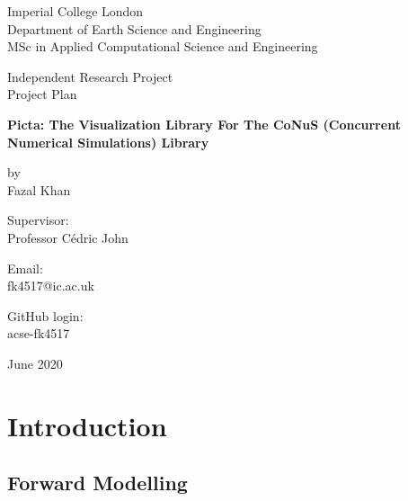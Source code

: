 \documentclass[12pt]{article}
\begin{document}
\begin{titlepage}
	\begin{center}
		\vspace*{1cm}
		
		Imperial College London \\
		Department of Earth Science and Engineering \\
		MSc in Applied Computational Science and Engineering
		
		\vspace{1cm}
		
		Independent Research Project \\
		Project Plan
		
		\vspace{1cm}
		
		{\fontsize{18}{104}\selectfont \textbf{Picta: The Visualization Library For The CoNuS (Concurrent Numerical Simulations) Library}}

		\vspace{1cm}
		
		by \\ 
		Fazal Khan
		
		\vspace{1cm}
		
		Supervisor: \\
		Professor Cédric John
		
		\vspace{1cm}
		
		Email: \\
		fk4517@ic.ac.uk
		
		\vspace{1cm}
		
		GitHub login: \\
		acse-fk4517
		
		\vspace{1.0cm}
		
		June 2020
		
	\end{center}
\end{titlepage}	
\section{Introduction}

\subsection{Forward Modelling}
\end{document}
